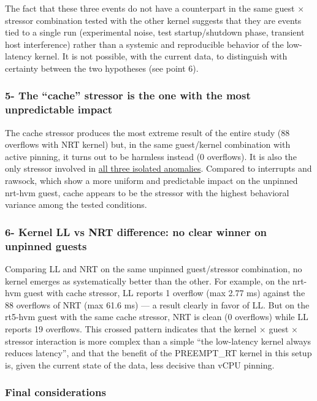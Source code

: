 The fact that these three events do not have a counterpart in the same
guest × stressor combination tested with the other kernel suggests that
they are events tied to a single run (experimental noise, test
startup/shutdown phase, transient host interference) rather than a
systemic and reproducible behavior of the low-latency kernel. It is not
possible, with the current data, to distinguish with certainty between
the two hypotheses (see point 6).

\subsubsection{5- The ``cache'' stressor is the one with the most
unpredictable
impact}\label{the-cache-stressor-is-the-one-with-the-most-unpredictable-impact}

The cache stressor produces the most extreme result of the entire study
(88 overflows with NRT kernel) but, in the same guest/kernel combination
with active pinning, it turns out to be harmless instead (0 overflows).
It is also the only stressor involved in
\protect\hyperlink{4-isolated-anomalies-not-reproducible-between-kernels}{all
three isolated anomalies}. Compared to interrupts and rawsock, which
show a more uniform and predictable impact on the unpinned nrt-hvm
guest, cache appears to be the stressor with the highest behavioral
variance among the tested conditions.

\subsubsection{6- Kernel LL vs NRT difference: no clear winner on
unpinned
guests}\label{kernel-ll-vs-nrt-difference-no-clear-winner-on-unpinned-guests}

Comparing LL and NRT on the same unpinned guest/stressor combination, no
kernel emerges as systematically better than the other. For example, on
the nrt-hvm guest with cache stressor, LL reports 1 overflow (max 2.77
ms) against the 88 overflows of NRT (max 61.6 ms) --- a result clearly
in favor of LL. But on the rt5-hvm guest with the same cache stressor,
NRT is clean (0 overflows) while LL reports 19 overflows. This crossed
pattern indicates that the kernel × guest × stressor interaction is more
complex than a simple ``the low-latency kernel always reduces latency'',
and that the benefit of the PREEMPT\_RT kernel in this setup is, given
the current state of the data, less decisive than vCPU pinning.

\subsubsection{Final considerations}\label{final-considerations}


